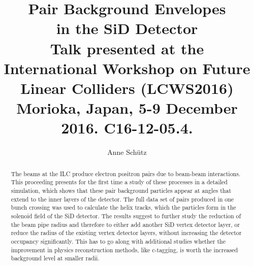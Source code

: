 \documentclass[12pt]{article}
\begin{document}

\title{Pair Background Envelopes\\in the SiD Detector\vspace*{0.3cm}\\{\normalsize Talk presented at the\\International Workshop on Future Linear Colliders (LCWS2016)\\Morioka, Japan, 5-9 December 2016. C16-12-05.4.}}

\author[1,2]{Anne Sch\"utz}


\maketitle


\begin{abstract}
The beams at the ILC produce electron positron pairs due to beam-beam interactions.
This proceeding presents for the first time a study of these processes in a detailed simulation, which shows that these pair background particles appear at angles that extend to the inner layers of the detector.
The full data set of pairs produced in one bunch crossing was used to calculate the helix tracks, which the particles form in the solenoid field of the SiD detector.
The results suggest to further study the reduction of the beam pipe radius and therefore to either add another SiD vertex detector layer, or reduce the radius of the existing vertex detector layers, without increasing the detector occupancy significantly.
This has to go along with additional studies whether the improvement in physics reconstruction methods, like c-tagging, is worth the increased background level at smaller radii.
\end{abstract}


\end{document}
